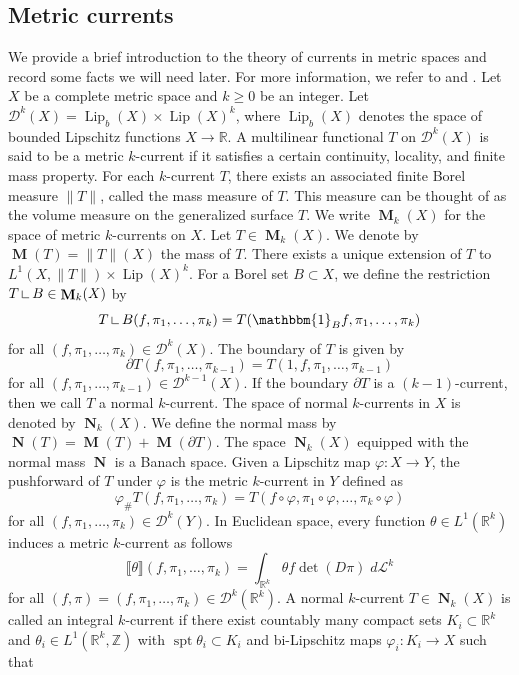 \documentclass{amsart}
\numberwithin{equation}{section}
\newcommand{\R}{\mathbb{R}}
\newcommand{\Z}{\mathbb{Z}}
\newcommand{\leb}{\mathcal{L}}
\newcommand{\spt}{\operatorname{spt}}
\newcommand{\Lip}{\operatorname{Lip}}
\newcommand{\on}{\:\mbox{\rule{0.1ex}{1.2ex}\rule{1.1ex}{0.1ex}}\:}
\DeclareMathOperator{\bM}{\mathbf{M}}
\DeclareMathOperator{\bN}{\mathbf{N}}
\newcommand{\bb}[1]{\llbracket #1\rrbracket}
\newcommand{\norm}[1]{\lVert#1\rVert}
\begin{document}
    \subsection{Metric currents}\label{sec: currents}
        We provide a brief introduction to the theory of currents in metric spaces and record some facts we will need later. For more information, we refer to \cite{ambrosio-kirchheim-2000} and \cite{lang-local}. Let $X$ be a complete metric space and $k \geq 0$ be an integer. Let  $\mathcal{D}^k(X) = \Lip_b(X) \times \Lip(X)^k$, where $\Lip_b(X)$ denotes the space of bounded Lipschitz functions $X \to \R$. A multilinear functional $T$ on $\mathcal{D}^k(X)$ is said to be a metric $k$-current if it satisfies a certain continuity, locality, and finite mass property. For each $k$-current $T$, there exists an associated finite Borel measure $\norm{T}$, called the mass measure of $T$. This measure can be thought of as the volume measure on the generalized surface $T$. We write $\bM_k(X)$ for the space of metric $k$-currents on $X$. Let $T \in \bM_k(X)$. We denote by $\bM(T) = \norm{T}(X)$ the mass of $T$. There exists a unique extension of $T$ to $L^1(X,\norm{T})\times\Lip(X)^k$. For a Borel set $B \subset X$, we define the restriction $T\on B \in \bM_k(X)$ by
        $$T\on B (f,\pi_1,\dots,\pi_k) = T(\mathbbm{1}_B f,\pi_1,\dots,\pi_k)$$
        for all $(f,\pi_1,\dots,\pi_{k})\in \mathcal{D}^{k}(X)$.
        The boundary of $T$ is given by
        $$\partial T (f,\pi_1,\dots,\pi_{k-1}) = T(1,f,\pi_1,\dots,\pi_{k-1})$$
        for all $(f,\pi_1,\dots,\pi_{k-1})\in \mathcal{D}^{k-1}(X)$. If the boundary $\partial T$ is a $(k-1)$-current, then we call $T$ a normal $k$-current. The space of normal $k$-currents in $X$ is denoted by $\bN_k(X)$. We define the normal mass by $\bN(T) = \bM(T) + \bM(\partial T)$. The space $\bN_k(X)$ equipped with the normal mass $\bN$ is a Banach space. Given a Lipschitz map $\varphi\colon X \to Y$, the pushforward of $T$ under $\varphi$ is the metric $k$-current in $Y$ defined as
        $$\varphi_\# T(f,\pi_1,\dots,\pi_k) = T(f\circ \varphi,\pi_1\circ \varphi,\dots,\pi_k\circ\varphi)$$
        for all $(f,\pi_1,\dots, \pi_{k})\in \mathcal{D}^k(Y)$. In Euclidean space, every function $\theta \in L^1(\R^k)$ induces a metric $k$-current as follows
        $$\bb{\theta}(f,\pi_1,\dots,\pi_k) = \int_{\R^k} \theta f \det(D \pi) \; d\leb^k$$
        for all $(f,\pi) = (f,\pi_1,\dots,\pi_k) \in \mathcal{D}^k(\R^k)$.  A normal $k$-current $T \in \bN_k(X)$ is called an integral $k$-current if there exist countably many compact sets $K_i \subset \R^k$ and $\theta_i \in L^1(\R^k,\Z)$ with $\spt \theta_i \subset K_i$ and bi-Lipschitz maps $\varphi_i \colon K_i \to X$ such that
\end{document}
